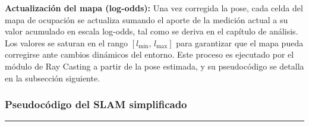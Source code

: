 \textbf{Actualización del mapa (log-odds):}
Una vez corregida la pose, cada celda del mapa de ocupación se actualiza sumando
el aporte de la medición actual a su valor acumulado en escala log-odds, tal como
se deriva en el capítulo de análisis. Los valores se saturan en el rango
$[l_{\min},\, l_{\max}]$ para garantizar que el mapa pueda corregirse ante cambios
dinámicos del entorno. Este proceso es ejecutado por el módulo de Ray Casting a
partir de la pose estimada, y su pseudocódigo se detalla en la subsección siguiente.

\subsubsection{Pseudocódigo del SLAM simplificado}


\begin{center}
\label{alg:slam}
\end{center}
\vspace{-1.8cm}
\rule{\textwidth}{0.4pt}
\vspace{-0.9cm}
